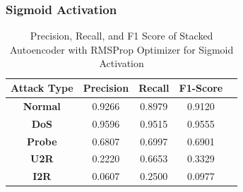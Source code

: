 \documentclass[12pt, a4paper]{report}
\begin{document}
\subsubsection{Sigmoid Activation}

\begin{table}[ht]
\centering
\captionsetup{justification=centering,margin=2cm}
\begin{tabular}{|c|c|c|c|c|}
\hline
\multicolumn{1}{|c|}{\textbf{Attack Type}} & \multicolumn{1}{c|}{\textbf{Precision}} & \multicolumn{1}{c|}{\textbf{Recall}} & \multicolumn{1}{c|}{\textbf{F1-Score}} \\ \hline
\textbf{Normal}        & 0.9266                                   & 0.8979                                & 0.9120                                                                  \\ \hline
\textbf{DoS}           & 0.9596                                  & 0.9515                                &  0.9555                                                                    \\ \hline
\textbf{Probe}         & 0.6807                                  & 0.6997                                & 0.6901                                                                  \\ \hline
\textbf{U2R}           & 0.2220                                    & 0.6653                                & 0.3329                                                                   \\ \hline
\textbf{I2R}           & 0.0607                                      & 0.2500                                   & 0.0977                                                            \\ \hline         \end{tabular}
\caption{Precision, Recall, and F1 Score of Stacked Autoencoder with RMSProp Optimizer for Sigmoid Activation}
\label{prf1_rmsprop_sigmoid_auto}
\end{table}
\end{document}
